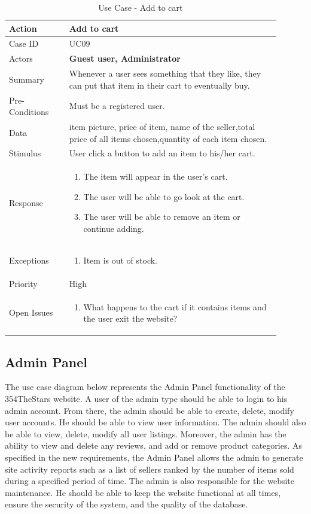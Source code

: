 \documentclass[11pt]{article}
\newcounter{use case ID}
\newcommand\tabularhead[1]{
    \begin{table}[ht]
        \addtocounter{use case ID}{1}
        \caption{Use Case \arabic{use case ID} - #1}
        \vspace{0.2cm}
        \begin{tabular}{|p{0.2\linewidth}|p{0.70\linewidth}|}
            \hline
            \textbf{Action} & \textbf{#1} \\
            \hline}
\newcommand\addrow[2]{#1 & #2\\ \hline}
\newcommand\addmulrow[2]{ \begin{minipage}[t][][t]{2.5cm}#1\end{minipage}
                &\begin{minipage}[t][][t]{11cm}
                    \begin{enumerate}[itemsep=-1ex] #2   \end{enumerate}
                \end{minipage}\vfill\\ \hline}
\newenvironment{usecase}{\tabularhead}
        {\hline\end{tabular}\end{table}}
\newcounter{req ID}
\begin{document}
\begin{usecase}{Add to cart}
    \addrow{Case ID}{UC09}
    \addrow{Actors}{\textbf{Guest user, Administrator}}
    \addrow{Summary}{Whenever a user sees something that they like, they can put that item in their cart to eventually buy.}
    \addrow{Pre-Conditions}{
       Must be a \index{registered user}registered user.
        }
    \addrow{\index{data}Data}{
item picture, price of item, name of the \index{seller}seller,total price of all items chosen,quantity of each item chosen.}
    \addrow{Stimulus}{User click a button to add an item to his/her cart.}
    \addmulrow{Response}{
        \item The item will appear in the user's cart.
        \item The user will be able to go look at the cart.
        \item The user will be able to remove an item or continue adding.
    }
    \addmulrow{Exceptions}{
        \item Item is out of stock.
    }
    \addrow{Priority}{High}
    \addmulrow{Open Issues}{
        \item What happens to the cart if it contains items and the user exit the website?
    }
\end{usecase}
\clearpage


\subsection{Admin Panel}

The use case diagram below represents the Admin Panel functionality of the 354TheStars website. A user of the admin type should be able to login to his admin account. From there, the admin should be able to create, delete, modify user accounts. He should be able to view user information. The admin should also be able to view, delete, modify all user listings. Moreover, the admin has the ability to view and delete any reviews, and add or remove product categories. As specified in the new requirements, the Admin Panel allows the admin to generate site activity reports such as a list of sellers ranked by the number of items sold during a specified period of time. The admin is also responsible for the website maintenance. He should be able to keep the website functional at all times, ensure the security of the system, and the quality of the database.
\end{document}
